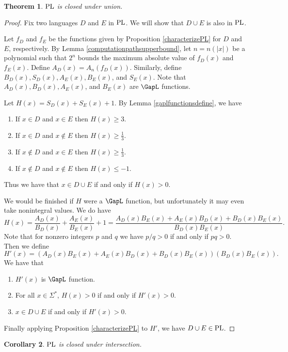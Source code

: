 \documentclass{amsbook}
\newtheorem{theorem}{Theorem}[chapter]
\newtheorem{corollary}[theorem]{Corollary}
\theoremstyle{definition}
\theoremstyle{remark}
\numberwithin{section}{chapter}
\numberwithin{equation}{chapter}
\renewcommand{\PL}{\mbox{\rm PL}}
\begin{document}
\begin{theorem}\label{plclosureunion}
$\PL$ is closed under union.
\end{theorem}
\begin{proof}
Fix two languages $D$ and $E$ in $\PL$. We will show that $D\cup E$ is also in $\PL$.

Let $f_D$ and $f_E$ be the functions given by Proposition \ref{characterizePL} for $D$ and $E$, respectively. By Lemma \ref{computationpathsupperbound}, let $n=n(|x|)$ be a polynomial such that $2^n$ bounds the maximum absolute value of $f_D(x)$ and $f_E(x)$. Define $A_D(x)=A_n(f_D(x))$. Similarly, define $B_D(x), S_D(x), A_E(x), B_E(x)$, and $S_E(x)$. Note that $A_D(x), B_D(x), A_E(x)$, and $B_E(x)$ are $\GapL$ functions.

Let $H(x)=S_D(x)+S_E(x)+1$. By Lemma \ref{gaplfunctionsdefine}, we have
\begin{enumerate}
\item If $x\in D$ and $x\in E$ then $H(x)\geq 3$.
\item If $x\in D$ and $x\not\in E$ then $H(x)\geq \frac{1}{3}$.
\item If $x\not\in D$ and $x\in E$ then $H(x)\geq \frac{1}{3}$.
\item If $x\not\in D$ and $x\not\in E$ then $H(x)\leq -1$.
\end{enumerate}
Thus we have that $x\in D\cup E$ if and only if $H(x)>0$.

We would be finished if $H$ were a $\GapL$ function, but unfortunately it may even take nonintegral values. We do have 
\[
H(x)=\frac{A_D(x)}{B_D(x)}+\frac{A_E(x)}{B_E(x)}+1=\frac{A_D(x)B_E(x)+A_E(x)B_D(x)+B_D(x)B_E(x)}{B_D(x)B_E(x)}.
\]
Note that for nonzero integers $p$ and $q$ we have $p/q>0$ if and only if $pq>0$. Then we define 
\[
H'(x)=(A_D(x)B_E(x)+A_E(x)B_D(x)+B_D(x)B_E(x))(B_D(x)B_E(x)).
\]
We have that 
\begin{enumerate}
\item $H'(x)$ is $\GapL$ function.
\item For all $x\in\Sigma^*$, $H(x)>0$ if and only if $H'(x)>0$.
\item $x\in D\cup E$ if and only if $H'(x)>0$.
\end{enumerate}
Finally applying Proposition \ref{characterizePL} to $H'$, we have $D\cup E\in\PL$.
\end{proof}

\begin{corollary}\label{plclosureintersection}
$\PL$ is closed under intersection.
\end{corollary}
\end{document}
